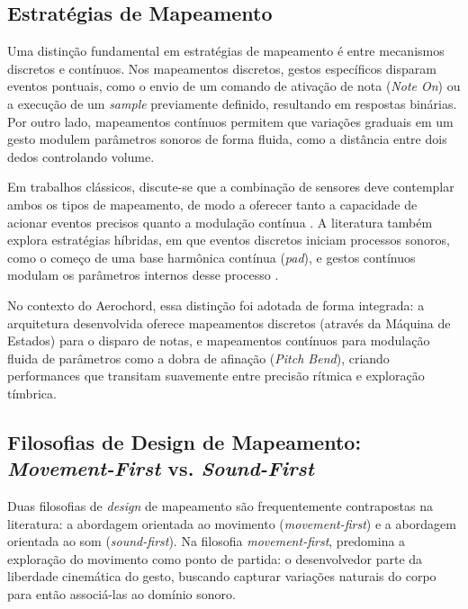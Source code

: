 \subsection{Estratégias de Mapeamento}
\label{subsec:estrategias_mapeamento}

Uma distinção fundamental em estratégias de mapeamento é entre mecanismos discretos e contínuos. Nos mapeamentos discretos, gestos específicos disparam eventos pontuais, como o envio de um comando de ativação de nota (\textit{Note On}) ou a execução de um \textit{sample} previamente definido, resultando em respostas binárias. Por outro lado, mapeamentos contínuos permitem que variações graduais em um gesto modulem parâmetros sonoros de forma fluida, como a distância entre dois dedos controlando volume.

Em trabalhos clássicos, discute-se que a combinação de sensores deve contemplar ambos os tipos de mapeamento, de modo a oferecer tanto a capacidade de acionar eventos precisos quanto a modulação contínua \cite{wanderley2000gestural, cadoz2000gesture}. A literatura também explora estratégias híbridas, em que eventos discretos iniciam processos sonoros, como o começo de uma base harmônica contínua (\textit{pad}), e gestos contínuos modulam os parâmetros internos desse processo \cite{wanderley2000gestural}.

No contexto do Aerochord, essa distinção foi adotada de forma integrada: a arquitetura desenvolvida oferece mapeamentos discretos (através da Máquina de Estados) para o disparo de notas, e mapeamentos contínuos para modulação fluida de parâmetros como a dobra de afinação (\textit{Pitch Bend}), criando performances que transitam suavemente entre precisão rítmica e exploração tímbrica.

\subsection{Filosofias de Design de Mapeamento: \textit{Movement-First} vs. \textit{Sound-First}}
\label{subsec:filosofias_mapeamento}

Duas filosofias de \textit{design} de mapeamento são frequentemente contrapostas na literatura: a abordagem orientada ao movimento (\textit{movement-first}) e a abordagem orientada ao som (\textit{sound-first}). Na filosofia \textit{movement-first}, predomina a exploração do movimento como ponto de partida: o desenvolvedor parte da liberdade cinemática do gesto, buscando capturar variações naturais do corpo para então associá-las ao domínio sonoro. 


